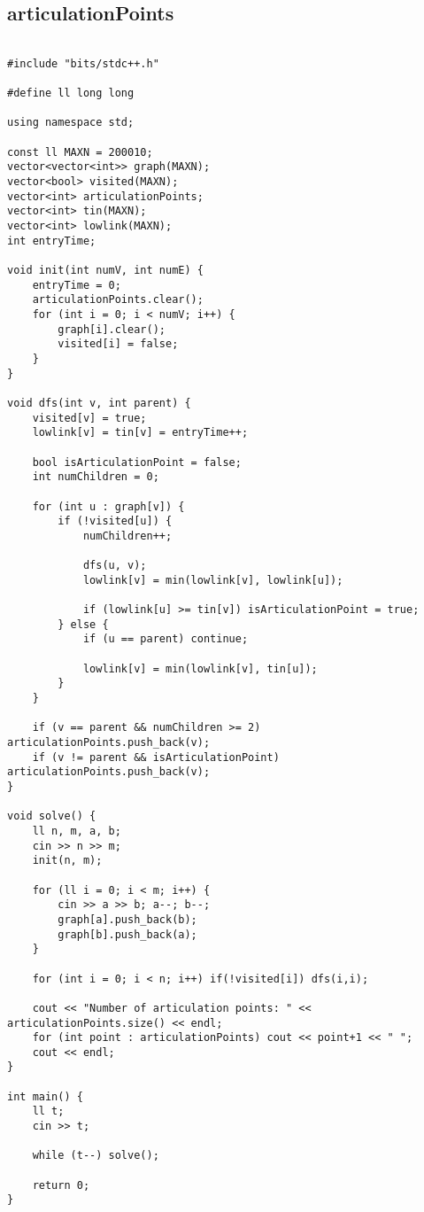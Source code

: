 \documentclass[landscape,twocolumn,10pt,a4paper]{article}
\begin{document}
\subsection{articulationPoints}
\begin{verbatim}

#include "bits/stdc++.h"

#define ll long long

using namespace std;

const ll MAXN = 200010;
vector<vector<int>> graph(MAXN);
vector<bool> visited(MAXN);
vector<int> articulationPoints;
vector<int> tin(MAXN);
vector<int> lowlink(MAXN);
int entryTime;

void init(int numV, int numE) {
    entryTime = 0;
    articulationPoints.clear();
    for (int i = 0; i < numV; i++) {
        graph[i].clear();
        visited[i] = false;
    }
}

void dfs(int v, int parent) {
    visited[v] = true;
    lowlink[v] = tin[v] = entryTime++;

    bool isArticulationPoint = false;
    int numChildren = 0;

    for (int u : graph[v]) {
        if (!visited[u]) {
            numChildren++;
            
            dfs(u, v);
            lowlink[v] = min(lowlink[v], lowlink[u]);

            if (lowlink[u] >= tin[v]) isArticulationPoint = true;
        } else {
            if (u == parent) continue;

            lowlink[v] = min(lowlink[v], tin[u]);
        }
    }

    if (v == parent && numChildren >= 2) articulationPoints.push_back(v);
    if (v != parent && isArticulationPoint) articulationPoints.push_back(v);
}

void solve() {
    ll n, m, a, b;
    cin >> n >> m;
    init(n, m);

    for (ll i = 0; i < m; i++) {
        cin >> a >> b; a--; b--;
        graph[a].push_back(b);
        graph[b].push_back(a);
    }

    for (int i = 0; i < n; i++) if(!visited[i]) dfs(i,i);

    cout << "Number of articulation points: " << articulationPoints.size() << endl;
    for (int point : articulationPoints) cout << point+1 << " ";
    cout << endl;
}

int main() {
    ll t;
    cin >> t;

    while (t--) solve();

    return 0;
}\end{verbatim}
\end{document}
